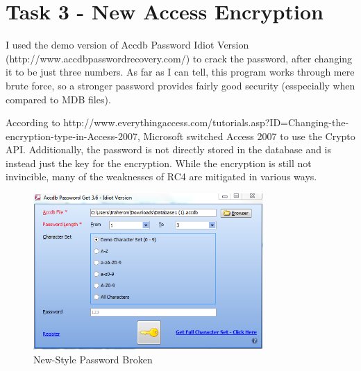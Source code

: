 \documentclass{article}
\begin{document}
\section{Task 3 - New Access Encryption}
\par I used the demo version of Accdb Password Idiot Version (http://www.accdbpasswordrecovery.com/) to crack the password, after changing it to be just three numbers. As far as I can tell, this program works through mere brute force, so a stronger password provides fairly good security (esspecially when compared to MDB files).

\par According to http://www.everythingaccess.com/tutorials.asp?ID=Changing-the-encryption-type-in-Access-2007, Microsoft switched Access 2007 to use the Crypto API. Additionally, the password is not directly stored in the database and is instead just the key for the encryption. While the encryption is still not invincible, many of the weaknesses of RC4 are mitigated in various ways.

\begin{figure}[h]
\centering
\includegraphics[width=0.78\textwidth]{2007_password_broken}
\caption{New-Style Password Broken}
\label{fig:2007_password_broken}
\end{figure}
\end{document}
